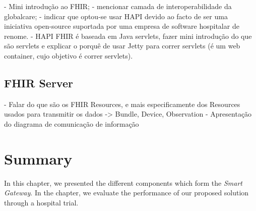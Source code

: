 - Mini introdução ao FHIR;
- mencionar camada de interoperabilidade da globalcare;
- indicar que optou-se usar HAPI devido ao facto de ser uma iniciativa open-source suportada por uma empresa de software hospitalar de renome.
- HAPI FHIR é baseada em Java servlets, fazer mini introdução do que são servlets e explicar o porquê de usar Jetty para correr servlets (é um web container, cujo objetivo é correr servlets). 

\subsection{FHIR Server}

- Falar do que são os FHIR Resources, e mais especificamente dos Resources usados para transmitir os dados -> Bundle, Device, Observation
- Apresentação do diagrama de comunicação de informação

\section{Summary}

In this chapter, we presented the different components which form the \textit{Smart Gateway}. In the chapter, we evaluate the performance of our proposed solution through a hospital trial.